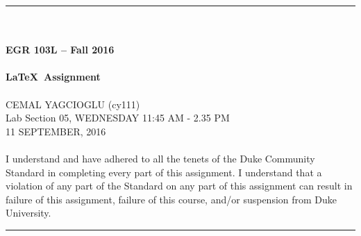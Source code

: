 \documentclass{article}
\begin{document}
\begin{center}
\rule{6.5in}{0.5mm}\\~\\
{\bf \large EGR 103L -- Fall 2016}\\~\\
{\huge \bf \LaTeX~Assignment}\\~\\
CEMAL YAGCIOGLU (cy111)\\
Lab Section 05, WEDNESDAY 11:45 AM - 2.35 PM\\
11 SEPTEMBER, 2016\\~\\ 
{\small I understand and have adhered to all the tenets of the Duke
  Community Standard in completing every part of this assignment.  I
  understand that a violation of any part of the Standard on any part
  of this assignment can result in failure of this assignment, failure
  of this course, and/or suspension from Duke University.} 
\rule{6.5in}{0.5mm}\\
\end{center}
\tableofcontents
\listoffigures
\pagebreak
\end{document}
